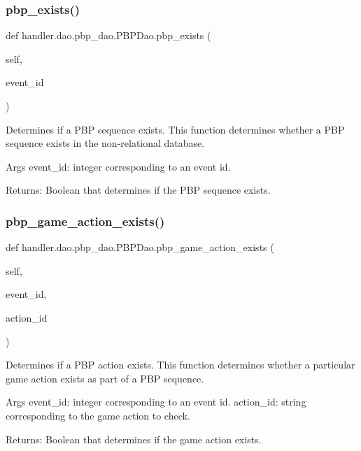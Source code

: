 \subsubsection{\texorpdfstring{pbp\+\_\+exists()}{pbp\_exists()}}
{\footnotesize\ttfamily def handler.\+dao.\+pbp\+\_\+dao.\+P\+B\+P\+Dao.\+pbp\+\_\+exists (\begin{DoxyParamCaption}\item[{}]{self,  }\item[{}]{event\+\_\+id }\end{DoxyParamCaption})}

\begin{DoxyVerb}Determines if a PBP sequence exists.
This function determines whether a PBP sequence exists in the non-relational database.

Args
    event_id: integer corresponding to an event id.

Returns:
    Boolean that determines if the PBP sequence exists.
\end{DoxyVerb}
 \mbox{\label{classhandler_1_1dao_1_1pbp__dao_1_1_p_b_p_dao_a8fba96941656e377125457deb83140d6}} 
\subsubsection{\texorpdfstring{pbp\+\_\+game\+\_\+action\+\_\+exists()}{pbp\_game\_action\_exists()}}
{\footnotesize\ttfamily def handler.\+dao.\+pbp\+\_\+dao.\+P\+B\+P\+Dao.\+pbp\+\_\+game\+\_\+action\+\_\+exists (\begin{DoxyParamCaption}\item[{}]{self,  }\item[{}]{event\+\_\+id,  }\item[{}]{action\+\_\+id }\end{DoxyParamCaption})}

\begin{DoxyVerb}Determines if a PBP action exists.
This function determines whether a particular game action exists as part of a PBP sequence.

Args
    event_id: integer corresponding to an event id.
    action_id: string corresponding to the game action to check.

Returns:
    Boolean that determines if the game action exists.
\end{DoxyVerb}
 \mbox{\label{classhandler_1_1dao_1_1pbp__dao_1_1_p_b_p_dao_a718cce233b89bd71d05297802ca68686}} 
